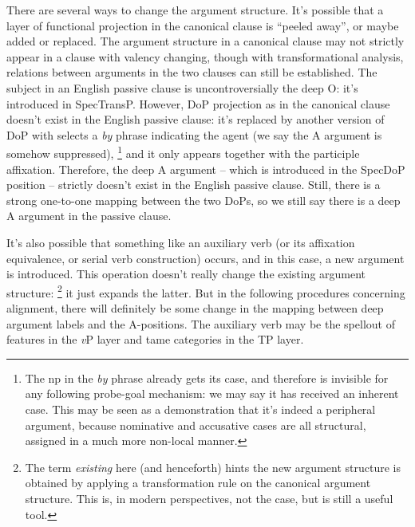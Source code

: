 \documentclass[UTF8, a4paper, oneside, scheme=plain]{ctexart}
\newcommand*{\term}[1]{\emph{#1}}
\newcommand*{\corpus}[1]{\emph{#1}}
\newcommand*{\vP}{\textit{v}P}
\begin{document}
There are several ways to change the argument structure.
It's possible that a layer of functional projection in the canonical clause is ``peeled away'',
or maybe added or replaced.
The argument structure in a canonical clause 
may not strictly appear in a clause with valency changing,
though with transformational analysis,
relations between arguments in the two clauses can still be established.
The subject in an English passive clause is uncontroversially the deep O:
it's introduced in SpecTransP.
However, DoP projection as in the canonical clause doesn't exist in the English passive clause:
it's replaced by another version of DoP with selects a \corpus{by} phrase indicating the agent
(we say the A argument is somehow suppressed),%
\footnote{
    The \ac{np} in the \corpus{by} phrase already gets its case,
    and therefore is invisible for any following probe-goal mechanism:
    we may say it has received an inherent case.
    This may be seen as a demonstration that it's indeed a peripheral argument,
    because nominative and accusative cases are all structural,
    assigned in a much more non-local manner.
}
and it only appears together with the participle affixation.
Therefore, the deep A argument -- which is introduced in the SpecDoP position -- 
strictly doesn't exist in the English passive clause.
Still, there is a strong one-to-one mapping between the two DoPs,
so we still say there is a deep A argument in the passive clause.

It's also possible that something like an auxiliary verb 
(or its affixation equivalence, or serial verb construction) occurs,
and in this case, 
a new argument is introduced.
This operation doesn't really change the existing argument structure:%
\footnote{
    The term \term{existing} here (and henceforth) hints the new argument structure is obtained by
    applying a transformation rule on the canonical argument structure.
    This is, in modern perspectives, not the case,
    but is still a useful tool.
}
it just expands the latter.
But in the following procedures concerning alignment,
there will definitely be some change
in the mapping between deep argument labels and the A-positions.
The auxiliary verb may be the spellout of features in the \vP{} layer
and \ac{tame} categories in the TP layer.
\end{document}
